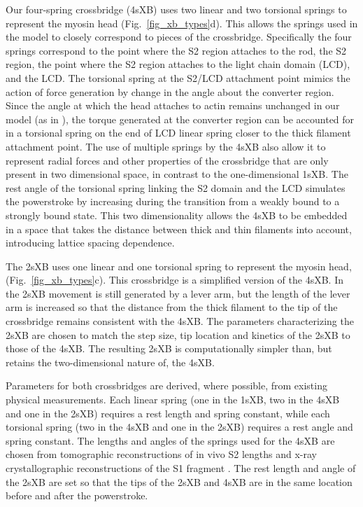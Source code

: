 \documentclass[]{article}
\begin{document}
Our four-spring crossbridge (4sXB) uses two linear and two torsional springs to represent the myosin head (Fig.~\ref{fig_xb_types}d).
This allows the springs used in the model to closely correspond to pieces of the crossbridge.
Specifically the four springs correspond to the point where the S2 region attaches to the rod, the S2 region, the point where the S2 region attaches to the light chain domain (LCD), and the LCD. 
The torsional spring at the S2/LCD attachment point mimics the action of force generation by change in the angle about the converter region. 
Since the angle at which the head attaches to actin remains unchanged in our model (as in ), the torque generated at the converter region can be accounted for in a torsional spring on the end of LCD linear spring closer to the thick filament attachment point. %
The use of multiple springs by the 4sXB also allow it to represent radial forces and other properties of the crossbridge that are only present in two dimensional space, in contrast to the one-dimensional 1sXB. 
The rest angle of the torsional spring linking the S2 domain and the LCD simulates the powerstroke by increasing during the transition from a weakly bound to a strongly bound state.
This two dimensionality allows the 4sXB to be embedded in a space that takes the distance between thick and thin filaments into account, introducing lattice spacing dependence.

The 2sXB uses one linear and one torsional spring to represent the myosin head, (Fig.~\ref{fig_xb_types}c).
This crossbridge is a simplified version of the 4sXB. 
In the 2sXB movement is still generated by a lever arm, but the length of the lever arm is increased so that the distance from the thick filament to the tip of the crossbridge remains consistent with the 4sXB.
The parameters characterizing the 2sXB are chosen to match the step size, tip location and kinetics of the 2sXB to those of the 4sXB. 
The resulting 2sXB is computationally simpler than, but retains the two-dimensional nature of, the 4sXB.

Parameters for both crossbridges are derived, where possible, from existing physical measurements.
Each linear spring (one in the 1sXB, two in the 4sXB and one in the 2sXB) requires a rest length and spring constant, while each torsional spring (two in the 4sXB and one in the 2sXB) requires a rest angle and spring constant.
The lengths and angles of the springs used for the 4sXB are chosen from tomographic reconstructions of in vivo S2 lengths and x-ray crystallographic reconstructions of the S1 fragment \citep{Taylor1999, Rayment1993}.
The rest length and angle of the 2sXB are set so that the tips of the 2sXB and 4sXB are in the same location before and after the powerstroke.
\end{document}
